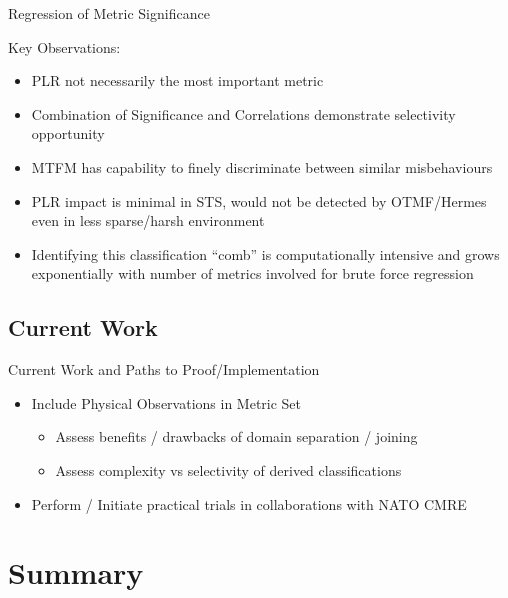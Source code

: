 \documentclass{beamer}
\begin{document}
\begin{frame}[allowframebreaks]{Regression of Metric Significance}
  \framebreak

  Key Observations:
  \begin{itemize}
    \item PLR not necessarily the most important metric
    \item Combination of Significance and Correlations demonstrate selectivity opportunity
    \item MTFM has capability to finely discriminate between similar misbehaviours
    \item PLR impact is minimal in STS, would not be detected by OTMF/Hermes even in less sparse/harsh environment
    \item Identifying this classification ``comb'' is computationally intensive and grows exponentially with number of metrics involved for brute force regression
  \end{itemize}
\end{frame}

\subsection{Current Work}

\begin{frame}{Current Work and Paths to Proof/Implementation}
  \begin{itemize}
    \item Include Physical Observations in Metric Set
      \begin{itemize}
        \item Assess benefits / drawbacks of domain separation / joining
        \item Assess complexity vs selectivity of derived classifications
      \end{itemize}
    \item Perform / Initiate practical trials in collaborations with NATO CMRE
  \end{itemize}
\end{frame}



\section*{Summary}
\end{document}
